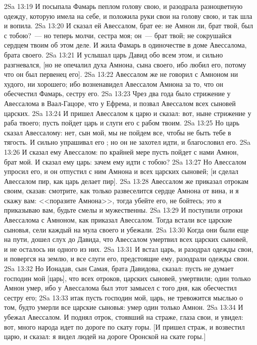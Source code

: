\vs 2Sa 13:19 И посыпала Фамарь пеплом голову свою, и разодрала разноцветную одежду, которую имела на себе, и положила руки свои на голову свою, и так шла и вопила.
\vs 2Sa 13:20 И сказал ей Авессалом, брат ее: не Амнон ли, брат твой, был с тобою?~--- но теперь молчи, сестра моя; он~--- брат твой; не сокрушайся сердцем твоим об этом деле. И жила Фамарь в одиночестве в доме Авессалома, брата своего.
\vs 2Sa 13:21 И услышал царь Давид обо всем этом, и сильно разгневался, [но не опечалил духа Амнона, сына своего, ибо любил его, потому что он был первенец его].
\vs 2Sa 13:22 Авессалом же не говорил с Амноном ни худого, ни хорошего; ибо возненавидел Авессалом Амнона за то, что он обесчестил Фамарь, сестру его.
\rsbpar\vs 2Sa 13:23 Чрез два года было стрижение  у Авессалома в Ваал-Гацоре, что у Ефрема, и позвал Авессалом всех сыновей царских.
\vs 2Sa 13:24 И пришел Авессалом к царю и сказал: вот, ныне стрижение  у раба твоего; пусть пойдет царь и слуги его с рабом твоим.
\vs 2Sa 13:25 Но царь сказал Авессалому: нет, сын мой, мы не пойдем все, чтобы не быть тебе в тягость. И сильно упрашивал его ; но он не захотел идти, и благословил его.
\vs 2Sa 13:26 И сказал ему Авессалом: по крайней мере пусть пойдет с нами Амнон, брат мой. И сказал ему царь: зачем ему идти с тобою?
\vs 2Sa 13:27 Но Авессалом упросил его, и он отпустил с ним Амнона и всех царских сыновей; [и сделал Авессалом пир, как царь делает пир].
\vs 2Sa 13:28 Авессалом же приказал отрокам своим, сказав: смотрите, как только развеселится сердце Амнона от вина, и я скажу вам: <<поразите Амнона>>, тогда убейте его, не бойтесь; это я приказываю вам, будьте смелы и мужественны.
\vs 2Sa 13:29 И поступили отроки Авессалома с Амноном, как приказал Авессалом. Тогда встали все царские сыновья, сели каждый на мула своего и убежали.
\vs 2Sa 13:30 Когда они были еще на пути, дошел слух до Давида, что Авессалом умертвил всех царских сыновей, и не осталось ни одного из них.
\vs 2Sa 13:31 И встал царь, и разодрал одежды свои, и повергся на землю, и все слуги его, предстоящие ему, разодрали одежды свои.
\vs 2Sa 13:32 Но Ионадав, сын Самая, брата Давидова, сказал: пусть не думает господин мой [царь], что всех отроков, царских сыновей, умертвили; один только Амнон умер, ибо у Авессалома был этот замысел с того дня, как  обесчестил сестру его;
\vs 2Sa 13:33 итак пусть господин мой, царь, не тревожится мыслью о том, будто умерли все царские сыновья: умер один только Амнон.
\vs 2Sa 13:34 И убежал Авессалом. И поднял отрок, стоявший на страже, глаза свои, и увидел: вот, много народа идет по дороге по скату горы. [И пришел страж, и возвестил царю, и сказал: я видел людей на дороге Оронской на скате горы.]
